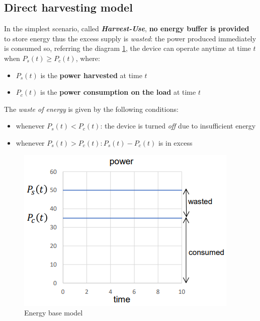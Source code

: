 \documentclass[10pt,a4paper]{report}
\theoremstyle{definition}
\begin{document}
\subsection{Direct harvesting model}\label{sec:direct-harvesting-model}
In the simplest scenario, called \textbf{\textit{Harvest-Use}}, \textbf{no energy buffer is provided} to store energy thus the excess supply is \textit{wasted}: the power produced immediately is consumed so, referring the diagram \ref{base-diagram-energy}, the device can operate anytime at time $t$ when
$P_{s}(t) \geq P_{c}(t)$, where:
\begin{itemize}
	\item 
	$P_{s}(t)$ is the \textbf{power harvested} at time $t$
	\item 
	$P_{c}(t)$ is the \textbf{power consumption on the load} at time $t$
\end{itemize}
The \textit{waste of energy} is given by the following conditions:
\begin{itemize}
	\item 
	whenever $P_{s}(t) < P_{c}(t)$: the device is turned \textit{off} due to insufficient energy
	\item 
	whenever $P_{s}(t) > P_{c}(t) : P_{s}(t)-P_{c}(t)$ is in excess
\end{itemize}

\begin{figure}[h]
	\centering\includegraphics[scale=0.50]{images/Pasted image 20230424163616.png}
	\caption{Energy base model}
\label{base-diagram-energy}
\end{figure}
\end{document}
